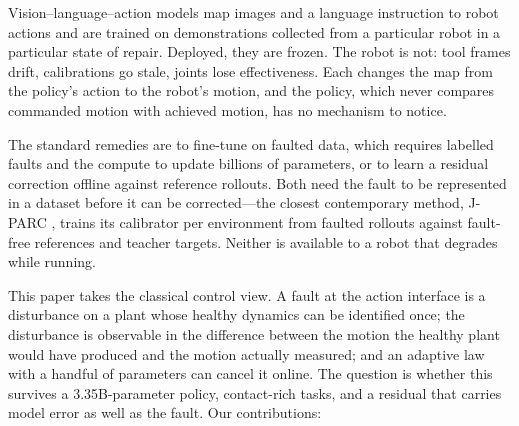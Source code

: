 \documentclass{article}
\begin{document}
Vision--language--action models map images and a language instruction to robot actions and
are trained on demonstrations collected from a particular robot in a particular state of
repair. Deployed, they are frozen. The robot is not: tool frames drift, calibrations go
stale, joints lose effectiveness. Each changes the map from the policy's action to the
robot's motion, and the policy, which never compares commanded motion with achieved
motion, has no mechanism to notice.

The standard remedies are to fine-tune on faulted data, which requires labelled faults and
the compute to update billions of parameters, or to learn a residual correction offline
against reference rollouts. Both need the fault to be represented in a dataset before it can be corrected---the
closest contemporary method, J-PARC \citep{jparc2026}, trains its calibrator per environment
from faulted rollouts against fault-free references and teacher targets. Neither is
available to a robot that degrades while running.

This paper takes the classical control view. A fault at the action interface is a
disturbance on a plant whose healthy dynamics can be identified once; the disturbance is
observable in the difference between the motion the healthy plant would have produced and
the motion actually measured; and an adaptive law with a handful of parameters can cancel
it online. The question is whether this survives a 3.35B-parameter policy, contact-rich
tasks, and a residual that carries model error as well as the fault. Our contributions:
\end{document}
